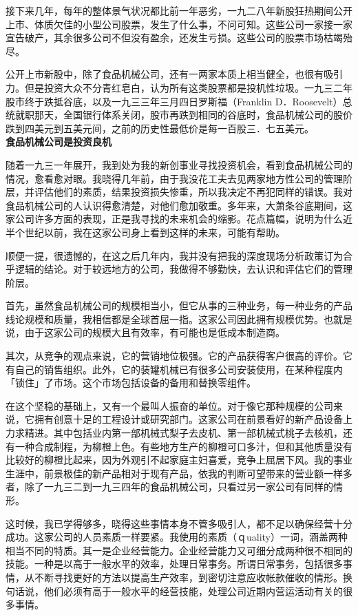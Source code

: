 \documentclass[UTF8,a4paper,zihao=-4,fontset = windows]{ctexart} %
\begin{document}
接下来几年，每年的整体景气状况都比前一年恶劣，一九二八年新股狂热期间公开上市、体质欠佳的小型公司股票，发生了什么事，不问可知。这些公司一家接一家宣告破产，其余很多公司不但没有盈余，还发生亏损。这些公司的股票市场枯竭殆尽。

公开上市新股中，除了食品机械公司，还有一两家本质上相当健全，也很有吸引力。但是投资大众不分青红皂白，认为所有这类股票都是投机性垃圾。一九三二年股市终于跌抵谷底，以及一九三三年三月四日罗斯福（Franklin D．Roosevelt）总统就职那天，全国银行体系关闭，股市再跌到相同的谷底时，食品机械公司的股价跌到四美元到五美元间，之前的历史性最低价是每一百股三．七五美元。
\\

\textbf{食品机械公司是投资良机}


随着一九三一年展开，我到处为我的新创事业寻找投资机会，看到食品机械公司的情况，愈看愈对眼。我晓得几年前，由于我没花工夫去见两家地方性公司的管理阶层，并评估他们的素质，结果投资损失惨重，所以我决定不再犯同样的错误。我对食品机械公司的人认识得愈清楚，对他们愈加敬重。多年来，大萧条谷底期间，这家公司许多方面的表现，正是我寻找的未来机会的缩影。花点篇幅，说明为什么近半个世纪以前，我在这家公司身上看到这样的未来，可能有帮助。

顺便一提，很遗憾的，在这之后几年内，我并没有把我的深度现场分析政策订为合乎逻辑的结论。对于较远地方的公司，我做得不够勤快，去认识和评估它们的管理阶层。

首先，虽然食品机械公司的规模相当小，但它从事的三种业务，每一种业务的产品线论规模和质量，我相信都是全球首屈一指。这家公司因此拥有规模优势。也就是说，由于这家公司的规模大且有效率，有可能也是低成本制造商。

其次，从竞争的观点来说，它的营销地位极强。它的产品获得客户很高的评价。它有自己的销售组织。此外，它的装罐机械已有很多公司安装使用，在某种程度内「锁住」了市场。这个市场包括设备的备用和替换零组件。

在这个坚稳的基础上，又有一个最叫人振奋的单位。对于像它那种规模的公司来说，它拥有创意十足的工程设计或研究部门。这家公司在前景看好的新产品设备上力求精进。其中包括业内第一部机械式梨子去皮机、第一部机械式桃子去核机，还有一种合成制程，为柳橙上色。有些地方生产的柳橙可口多汁，但和其他质量没有比较好的柳橙比起来，因为外观引不起家庭主妇喜爱，竞争上屈居下风。我的事业生涯中，前景极佳的新产品相对于现有产品，依我的判断可望带来的营业额一样多者，除了一九三二到一九三四年的食品机械公司，只看过另一家公司有同样的情形。

这时候，我已学得够多，晓得这些事情本身不管多吸引人，都不足以确保经营十分成功。这家公司的人员素质一样要紧。我使用的素质（ｑuality）一词，涵盖两种相当不同的特质。其一是企业经营能力。企业经营能力又可细分成两种很不相同的技能。一种是以高于一般水平的效率，处理日常事务。所谓日常事务，包括很多事情，从不断寻找更好的方法以提高生产效率，到密切注意应收帐款催收的情形。换句话说，他们必须有高于一般水平的经营技能，处理公司近期内营运活动有关的很多事情。
\end{document}
